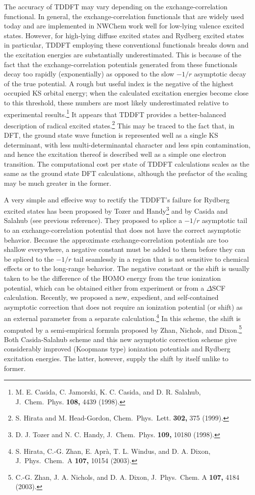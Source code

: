 The accuracy of TDDFT may vary depending on the exchange-correlation functional.
In general, the exchange-correlation functionals that are widely used today and are implemented
in NWChem work well for low-lying valence excited states.  However, for high-lying diffuse
excited states and Rydberg excited states in particular, TDDFT employing these 
conventional functionals breaks down and the excitation energies are substantially 
underestimated.  This is because of the fact that the exchange-correlation potentials
generated from these functionals decay too rapidly (exponentially) as opposed to the 
slow $-1/r$ asymptotic decay of the true potential.  A rough but useful index is the 
negative of the highest occupied KS orbital energy; when the calculated excitation energies
become close to this threshold, these numbers are most likely underestimated relative
to experimental results.\footnote{M. E. Casida, C. Jamorski, K. C. Casida, and D. R. Salahub, J.\ Chem.\ Phys. {\bf 108,} 4439 (1998).}  It appears that TDDFT provides a better-balanced description
of radical excited states.\footnote{S. Hirata and M. Head-Gordon, Chem.\ Phys.\ Lett. {\bf 302,} 375 (1999).} 
This may be traced to the fact that, in DFT, the ground state
wave function is represented well as a single KS determinant, with less multi-determinantal
character and less spin contamination, and hence the excitation thereof is described well
as a simple one electron transition.  The computational cost per state of TDDFT calculations 
scales as the same as the ground state DFT calculations, although the prefactor of the scaling
may be much greater in the former.

A very simple and effecive way to rectify the TDDFT's failure for Rydberg excited states
has been proposed by Tozer and Handy\footnote{D. J. Tozer and N. C. Handy, J.\ Chem.\ Phys. {\bf 109,} 10180 (1998).} and by Casida and Salahub (see previous reference).  They proposed to splice a $-1/r$ asymptotic
tail to an exchange-correlation potential that does not have the correct asymptotic behavior.
Because the approximate exchange-correlation potentials are too shallow everywhere, a negative constant
must be added to them before they can be spliced to the $-1/r$ tail seamlessly in a region that is not
sensitive to chemical effects or to the long-range behavior.  The negative constant or the shift is usually
taken to be the difference of the HOMO energy from the true ionization potential, which can be obtained
either from experiment or from a $\Delta$SCF calculation.  Recently, we proposed a new, expedient, and
self-contained asymptotic correction that does not require an ionization potential (or shift) as an external parameter from a separate calculation.\footnote{S. Hirata, C.-G. Zhan, E. Apr\`{a}, T. L. Windus, and D. A. Dixon, J.\ Phys.\ Chem.\ A {\bf 107,} 10154 (2003).}  In this scheme, the shift is computed by a semi-empirical
formula proposed by Zhan, Nichols, and Dixon.\footnote{C.-G. Zhan, J. A. Nichols, and D. A. Dixon, J.\ Phys.\ Chem. A {\bf 107,} 4184 (2003).}  Both Casida-Salahub scheme and this new asymptotic correction scheme give considerably improved (Koopmans type) ionization potentials and Rydberg excitation energies.
The latter, however, supply the shift by itself unlike to former.

